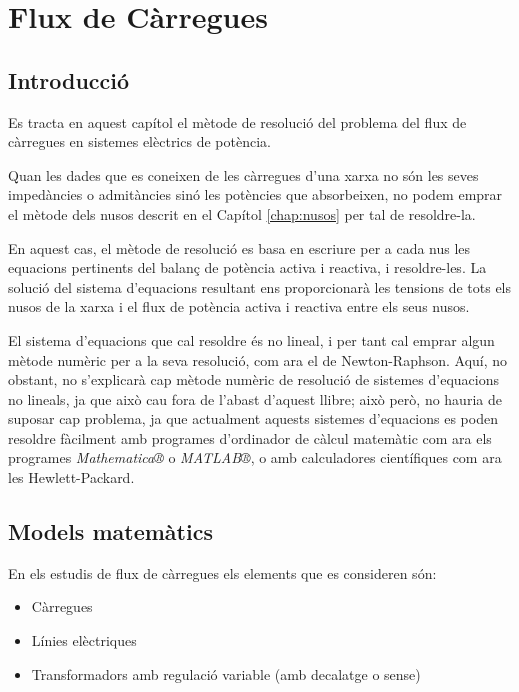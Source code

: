 \chapter{Flux de Càrregues}
\label{chap:flux_carregues}

\section{Introducció}

Es tracta en aquest capítol el mètode de resolució del problema del flux de càrregues en
sistemes elèctrics de potència.

Quan les dades que es coneixen de les càrregues d'una xarxa no són
les seves impedàncies o admitàncies sinó les potències que
absorbeixen, no podem emprar el mètode dels nusos descrit en el
Capítol \ref{chap:nusos} per tal de resoldre-la.

En aquest cas, el mètode de resolució es basa en escriure per a cada
nus les equacions pertinents del balanç de potència activa i
reactiva, i resoldre-les. La solució del sistema d'equacions
resultant ens proporcionarà les tensions de tots els nusos de la
xarxa i el flux de potència activa i reactiva entre els seus nusos.

El sistema d'equacions que cal resoldre és no lineal, i per tant
cal emprar algun mètode numèric per a la seva resolució, com ara el
de Newton-Raphson.  Aquí, no obstant, no
s'explicarà cap mètode numèric de resolució de sistemes d'equacions
no lineals, ja que això cau fora de l'abast d'aquest llibre; això
però, no hauria de suposar cap problema, ja que actualment aquests
sistemes d'equacions es poden resoldre fàcilment amb programes
d'ordinador de càlcul matemàtic com ara els programes
\emph{Mathematica®} o \emph{MATLAB®}, o amb calculadores
científiques com ara les Hewlett-Packard.

\section{Models matemàtics} 

En els estudis de flux de càrregues els elements que es consideren són:
\begin{itemize}
   \item Càrregues
   \item Línies elèctriques
   \item Transformadors amb regulació variable (amb decalatge o sense)
\end{itemize}

